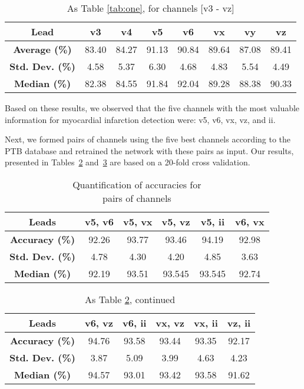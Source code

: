 \documentclass{svproc}
\begin{document}
\renewcommand{\arraystretch}{1.2}
\begin{table}[hbt!]\centering
\caption{As Table \ref{tab:one}, for channels [v3 - vz]}
\begin{tabular}{c|c|c|c|c|c|c|c}
\textbf{Lead}         & v3 & v4 & v5  & v6 & vx & vy & vz\\ \hline
\textbf{Average (\%)} & 83.40  & 84.27 & 91.13 & 90.84 & 89.64  & 87.08  & 89.41 \\ 
\textbf{Std. Dev. (\%)} & 4.58  & 5.37 & 6.30 & 4.68 & 4.83  & 5.54  & 4.49 \\ 
\textbf{Median (\%)} & 82.38  & 84.55 & 91.84 & 92.04 & 89.28  & 88.38  & 90.33
\label{tab:two}
\end{tabular}
\end{table}

\noindent Based on these results, we observed that the five channels with the most valuable information for myocardial infarction detection were: v5, v6, vx, vz, and ii.

Next, we formed pairs of channels using the five best channels according to the PTB database and retrained the network with these pairs as input. Our results, presented in Tables~\ref{tab:four} and~\ref{tab:five} are based on a 20-fold cross validation.

\renewcommand{\arraystretch}{1.2}
\begin{table}[hbt!]\centering
\caption{Quantification of accuracies for \\pairs of channels}
\begin{tabular}{c|c|c|c|c|c}
\textbf{Leads}          & v5, v6  & v5, vx & v5, vz & v5, ii & v6, vx \\ \hline
\textbf{Accuracy (\%)} & 92.26 & 93.77 & 93.46 & 94.19  & 92.98  \\ 
\textbf{Std. Dev. (\%)} & 4.78 & 4.30 & 4.20 & 4.85 & 3.63  \\ 
\textbf{Median (\%)} & 92.19 & 93.51 & 93.545 & 93.545 & 92.74
\label{tab:four}
\end{tabular}
\end{table}


\renewcommand{\arraystretch}{1.2}
\begin{table}[hbt!]\centering
\caption{As Table \ref{tab:four}, continued}
\begin{tabular}{c|c|c|c|c|c}
\textbf{Leads}          & v6, vz & v6, ii & vx, vz & vx, ii & vz, ii \\ \hline
\textbf{Accuracy (\%)} & 94.76 & 93.58 & 93.44 & 93.35 & 92.17  \\ 
\textbf{Std. Dev. (\%)} & 3.87 & 5.09 & 3.99 & 4.63 & 4.23  \\ 
\textbf{Median (\%)} & 94.57 & 93.01 & 93.42 & 93.58 & 91.62 
\label{tab:five}
\end{tabular}
\end{table}
\end{document}
